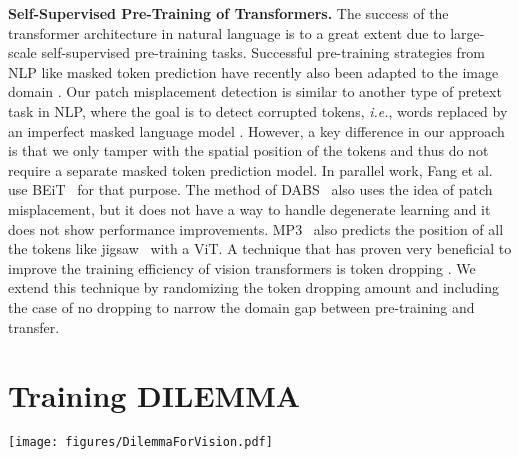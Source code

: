 \documentclass[letterpaper]{article} \usepackage{aaai23}  \usepackage{times}  \usepackage{helvet}  \usepackage{courier}  \usepackage[hyphens]{url}  \usepackage{graphicx} \urlstyle{rm} \def\UrlFont{\rm}  \usepackage{natbib}  \usepackage{caption} \frenchspacing  \setlength{\pdfpagewidth}{8.5in}  \setlength{\pdfpageheight}{11in}  \usepackage{algorithm}
\newcommand{\methodname}{DILEMMA}
\begin{document}
\noindent\textbf{Self-Supervised Pre-Training of Transformers.}
The success of the transformer architecture \cite{vaswani2017attention} in natural language is to a great extent due to large-scale self-supervised pre-training tasks.
Successful pre-training strategies from NLP like masked token prediction \cite{devlin2018bert} have recently also been adapted to the image domain \cite{bao2021beit,zhou2021ibot,he2021masked,zhou2021ibot}. 
Our patch misplacement detection is similar to another type of pretext task in NLP, where the goal is to detect corrupted tokens, \emph{i.e.}, words replaced by an imperfect masked language model \cite{clark2020electra,clark2020pre}.
However, a key difference in our approach is that we only tamper with the spatial position of the tokens and thus do not require a separate masked token prediction model. In parallel work, Fang et al.~\cite{Fang2022CorruptedIM} use BEiT~\cite{bao2021beit} for that purpose.
The method of DABS~\cite{tamkin2021dabs} also uses the idea of patch misplacement, but it does not have a way to handle degenerate learning and it does not show performance improvements. MP3~\cite{Zhai2022PositionPA} also predicts the position of all the tokens like jigsaw~\cite{noroozi2016unsupervised} with a ViT. A technique that has proven very beneficial to improve the training efficiency of vision transformers is token dropping \cite{akbari2021vatt,he2021masked,el2021large,chen2022context}. 
We extend this technique by randomizing the token dropping amount and including the case of no dropping to narrow the domain gap between pre-training and transfer.

\section{Training \methodname}

\begin{figure*}[t]
	\centering
	\texttt{[image: figures/DilemmaForVision.pdf]}
	\caption{Training with \methodname: A sample image is augmented twice and split into tiles (we use a  grid). The Teacher network takes the complete set of tiles as input (dense) and without mismatches in the positional embeddings for each token. The Student takes only a subset of the tiles as input (sparse) and some tiles have incorrect positional embeddings. The Student is then trained under two losses: one is the contrastive loss of the class tokens (CLS) between the Teacher and the Student, and the other is the {\methodname} binary cross-entropy for each token.
	}
	\label{fig:DILEMMA}
\end{figure*}
\end{document}
